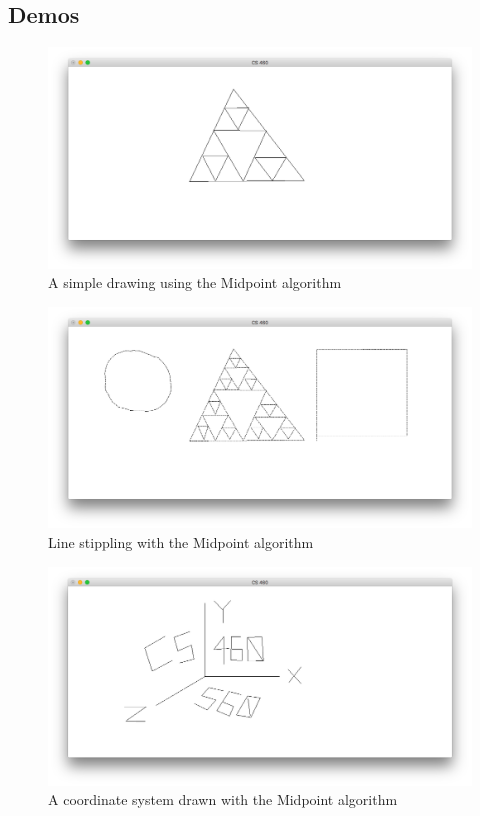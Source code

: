 \documentclass{article}
\begin{document}
\subsection{Demos}
\label{sec:orgheadline8}
\begin{figure}[htb]
\centering
\includegraphics[width=.9\linewidth]{./img/a1_midpt_basic.png}
\caption{A simple drawing using the Midpoint algorithm}
\end{figure}
\begin{figure}[htb]
\centering
\includegraphics[width=.9\linewidth]{./img/a1_midpt_stipple.png}
\caption{Line stippling with the Midpoint algorithm}
\end{figure}
\begin{figure}[htb]
\centering
\includegraphics[width=.9\linewidth]{./img/a1_coord.png}
\caption{A coordinate system drawn with the Midpoint algorithm}
\end{figure}
\end{document}
